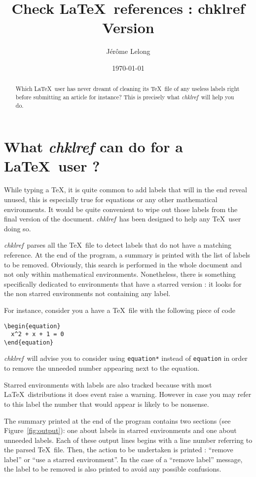 \documentclass[a4paper,11pt,twoside]{article}
\title{Check \LaTeX\ references : chklref \\
Version \chkVERSION}
\date{\today}
\author{J\'er\^ome Lelong}
\def\chk{{\it chklref}}
\begin{document}
\maketitle

\begin{abstract} Which \LaTeX\ user has never dreamt of cleaning its \TeX\ file
  of any useless labels right before submitting an article for instance? This is
  precisely what \chk\ will help you do.
\end{abstract}

\section{What {\it chklref} can do for a \LaTeX\ user ?}

While typing a \TeX, it is quite common to add labels that will in the end
reveal unused, this is especially true for equations or any other mathematical
environments. It would be quite convenient to wipe out those labels from the
final version of the document. \chk\ has been designed to help any \TeX\
user doing so.

\chk\ parses all the \TeX\ file to detect labels that do not have a matching
reference. At the end of the program, a summary is printed with the list of
labels to be removed. Obviously, this search is performed in the whole document
and not only within mathematical environments. Nonetheless, there is something
specifically dedicated to environments that have a starred version : it looks
for the non starred environments not containing any label.

For instance, consider you a have a \TeX\ file with the following piece of code
\begin{verbatim}
\begin{equation}
  x^2 + x + 1 = 0
\end{equation}
\end{verbatim}
\chk\ will advise you to consider using \verb!equation*! instead of
\verb!equation! in order to remove the unneeded number appearing next to the
equation.

Starred environments with labels are also tracked because with most \LaTeX\
distributions it does event raise a warning. However in case you may refer to
this label the number that would appear is likely to be nonsense.

The summary printed at the end of the program contains two sections (see
Figure~\ref{fig:output}): one about labels in starred environments and one about
unneeded labels. Each of these output lines begins with a line number referring
to the parsed \TeX\ file. Then, the action to be undertaken is printed :
``remove label'' or ``use a starred environment''. In the case of a ``remove
label'' message, the label to be removed is also printed to avoid any possible
confusions.
\end{document}
